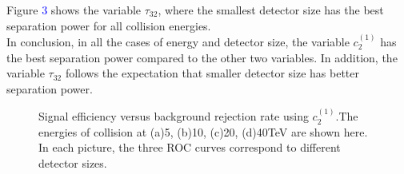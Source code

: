 \documentclass[final,1p,11pt]{elsarticle}
\begin{document}
Figure \textcolor{blue}{3} shows the variable $\tau_{32}$, where the smallest detector size has the best separation power for all collision energies.\\

In conclusion, in all the cases of energy and detector size, the variable $c_2^{(1)}$ has the best separation power compared to the other two variables. In addition, the variable $\tau_{32}$ follows the expectation that smaller detector size has better separation power.\\

\label{sec:efficiency}

\begin{figure}
\begin{center}
\end{center}
\caption{Signal efficiency versus background rejection rate using $c_2^{(1)}$.The energies of collision at (a)5, (b)10, (c)20, (d)40TeV are shown here. In each picture, the three ROC curves correspond to different detector sizes.}
\label{fig:cluster_c2b1}
\end{figure}
\end{document}
